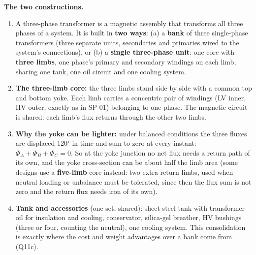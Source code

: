 \documentclass[11pt]{article}
\begin{document}
\textbf{The two constructions.}
\begin{enumerate}[label=\arabic*.]
\item A three-phase transformer is a magnetic assembly that transforms all three phases of a system. It is built in \textbf{two ways}: (a) a \textbf{bank} of three single-phase transformers (three separate units, secondaries and primaries wired to the system's connections), or (b) a \textbf{single three-phase unit}: one core with \textbf{three limbs}, one phase's primary and secondary windings on each limb, sharing one tank, one oil circuit and one cooling system.
\item \textbf{The three-limb core:} the three limbs stand side by side with a common top and bottom yoke. Each limb carries a concentric pair of windings (LV inner, HV outer, exactly as in SP-01) belonging to one phase. The magnetic circuit is shared: each limb's flux returns through the other two limbs.
\item \textbf{Why the yoke can be lighter:} under balanced conditions the three fluxes are displaced 120$^\circ$ in time and sum to zero at every instant: $\Phi_A + \Phi_B + \Phi_C = 0$. So at the yoke junction no net flux needs a return path of its own, and the yoke cross-section can be about half the limb area (some designs use a \textbf{five-limb} core instead: two extra return limbs, used when neutral loading or unbalance must be tolerated, since then the flux sum is not zero and the return flux needs iron of its own).
\item \textbf{Tank and accessories} (one set, shared): sheet-steel tank with transformer oil for insulation and cooling, conservator, silica-gel breather, HV bushings (three or four, counting the neutral), one cooling system. This consolidation is exactly where the cost and weight advantages over a bank come from (Q11c).
\end{enumerate}
\end{document}
